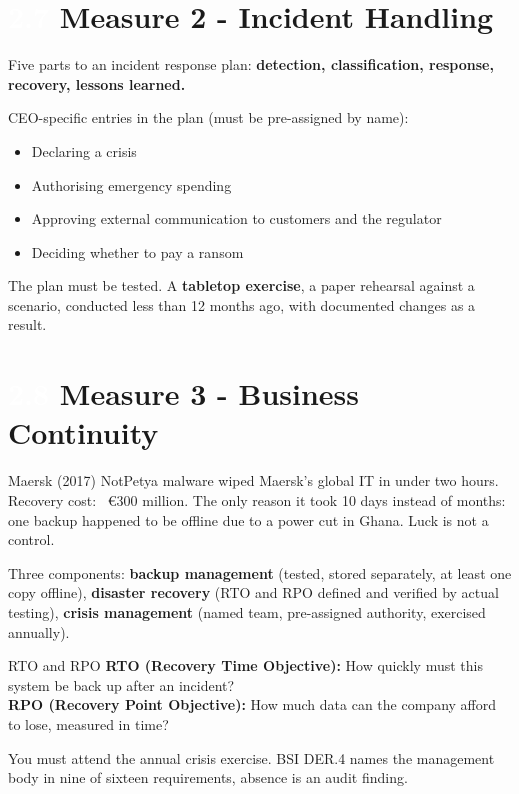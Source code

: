 \documentclass[11pt,a4paper,twoside]{book}
\newcommand{\lessontag}[1]{%
  \texorpdfstring{%
    \setlength{\fboxsep}{3pt}\colorbox{nisd2blue}{\textcolor{white}{\footnotesize\bfseries #1}}\quad%
  }{Lesson #1\ }%
}
\begin{document}
\section{\lessontag{2.7}Measure 2 - Incident Handling}

Five parts to an incident response plan: \textbf{detection, classification, response, recovery, lessons learned.}

CEO-specific entries in the plan (must be pre-assigned by name):
\begin{itemize}
  \item Declaring a crisis
  \item Authorising emergency spending
  \item Approving external communication to customers and the regulator
  \item Deciding whether to pay a ransom
\end{itemize}

The plan must be tested. A \textbf{tabletop exercise}, a paper rehearsal against a scenario, conducted less than 12 months ago, with documented changes as a result.

\section{\lessontag{2.8}Measure 3 - Business Continuity}

\begin{casestudy}{Maersk (2017)}
NotPetya malware wiped Maersk's global IT in under two hours. Recovery cost: ~€300 million. The only reason it took 10 days instead of months: one backup happened to be offline due to a power cut in Ghana. Luck is not a control.
\end{casestudy}

Three components: \textbf{backup management} (tested, stored separately, at least one copy offline), \textbf{disaster recovery} (RTO and RPO defined and verified by actual testing), \textbf{crisis management} (named team, pre-assigned authority, exercised annually).

\begin{definitionbox}{RTO and RPO}
\textbf{RTO (Recovery Time Objective):} How quickly must this system be back up after an incident? \\
\textbf{RPO (Recovery Point Objective):} How much data can the company afford to lose, measured in time?
\end{definitionbox}

You must attend the annual crisis exercise. BSI DER.4 names the management body in nine of sixteen requirements, absence is an audit finding.
\end{document}
